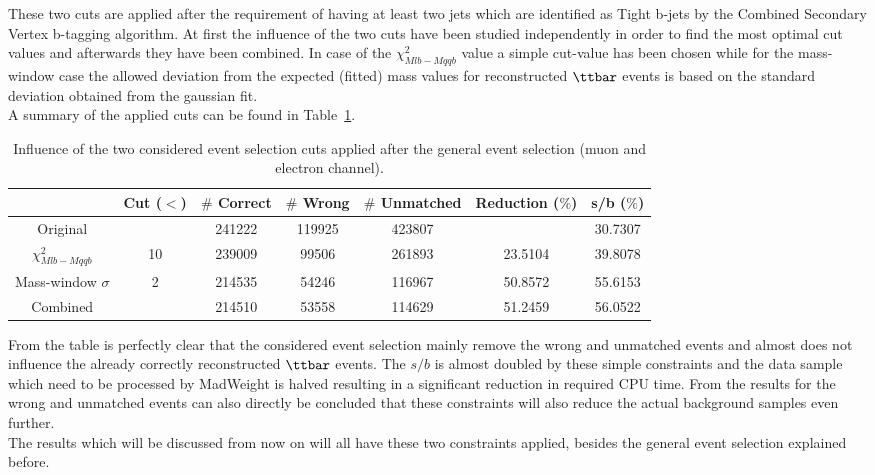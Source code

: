 These two cuts are applied after the requirement of having at least two jets which are identified as Tight b-jets by the Combined Secondary Vertex b-tagging algorithm. At first the influence of the two cuts have been studied independently in order to find the most optimal cut values and afterwards they have been combined. In case of the $\chi^{2}_{Mlb-Mqqb}$ value a simple cut-value has been chosen while for the mass-window case the allowed deviation from the expected (fitted) mass values for reconstructed $\ttbar$ events is based on the standard deviation obtained from the gaussian fit.\\
A summary of the applied cuts can be found in Table~\ref{table::CutInfl}.

\begin{table}[h!b]
 \caption{Influence of the two considered event selection cuts applied after the general event selection (muon and electron channel).} \label{table::CutInfl}
 \centering
 \begin{tabular}{|c|c|c|c|c|c|c|}
  \hline
				& Cut ($<$) 	& $\#$ Correct 	& $\#$ Wrong 	& $\#$ Unmatched 	& Reduction ($\%$)  	& s/b ($\%$) 	\\
  \hline
  Original 			& 		& 241222 	& 119925 	& 423807 		& 	 	 	& 30.7307 	\\
  \hline
  \hline
  $\chi^{2}_{Mlb-Mqqb}$		& 10 		& 239009 	& 99506 	& 261893 		& 23.5104 		& 39.8078 	\\
  \hline
  Mass-window $\sigma$  	& 2 		& 214535 	& 54246 	& 116967 		& 50.8572 		& 55.6153 	\\
  \hline
  \hline
  Combined 			& 		& 214510 	& 53558 	& 114629 		& 51.2459 		& 56.0522 	\\
  \hline
 \end{tabular}
\end{table}
From the table is perfectly clear that the considered event selection mainly remove the wrong and unmatched events and almost does not influence the already correctly reconstructed $\ttbar$ events. The $s/b$ is almost doubled by these simple constraints and the data sample which need to be processed by MadWeight is halved resulting in a significant reduction in required CPU time. From the results for the wrong and unmatched events can also directly be concluded that these constraints will also reduce the actual background samples even further.
\\

The results which will be discussed from now on will all have these two constraints applied, besides the general event selection explained before.

